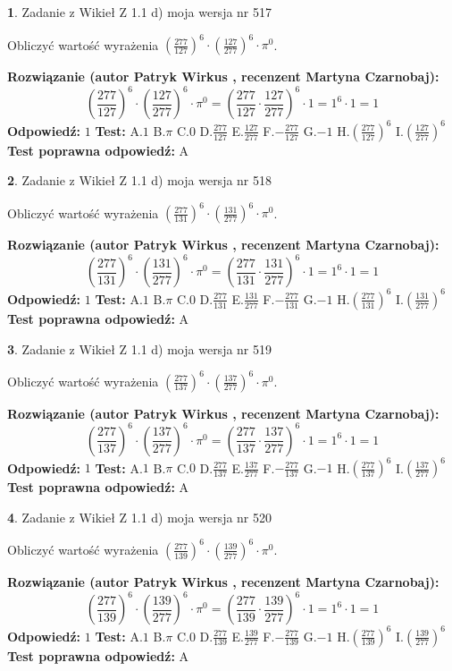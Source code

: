 \documentclass[12pt, a4paper]{article}
\theoremstyle{definition} %
\newtheorem{zad}{}
\newcommand{\zadStart}[1]{\begin{zad}#1\newline}
\newcommand{\zadStop}{\end{zad}}
\newcommand{\rozwStart}[2]{\noindent \textbf{Rozwiązanie (autor #1 , recenzent #2): }\newline}
\newcommand{\rozwStop}{\newline}
\newcommand{\odpStart}{\noindent \textbf{Odpowiedź:}\newline}
\newcommand{\odpStop}{\newline}
\newcommand{\testStart}{\noindent \textbf{Test:}\newline}
\newcommand{\testStop}{\newline}
\newcommand{\kluczStart}{\noindent \textbf{Test poprawna odpowiedź:}\newline}
\newcommand{\kluczStop}{\newline}
\begin{document}
\zadStart{Zadanie z Wikieł Z 1.1 d) moja wersja nr 517}

Obliczyć wartość wyrażenia $(\frac{277}{127})^{6} \cdot (\frac{127}{277})^{6} \cdot \pi^{0}$.
\zadStop
\rozwStart{Patryk Wirkus}{Martyna Czarnobaj}
$$(\frac{277}{127})^{6} \cdot (\frac{127}{277})^{6} \cdot \pi^{0} = (\frac{277}{127} \cdot \frac{127}{277})^{6} \cdot 1 = 1^{6} \cdot 1 = 1$$
\rozwStop
\odpStart
$1$
\odpStop
\testStart
A.$1$ B.$\pi$ C.$0$ D.$\frac{277}{127}$ E.$\frac{127}{277}$
F.$-\frac{277}{127}$ G.$-1$
H.$(\frac{277}{127})^{6}$
I.$(\frac{127}{277})^{6}$
\testStop
\kluczStart
A
\kluczStop



\zadStart{Zadanie z Wikieł Z 1.1 d) moja wersja nr 518}

Obliczyć wartość wyrażenia $(\frac{277}{131})^{6} \cdot (\frac{131}{277})^{6} \cdot \pi^{0}$.
\zadStop
\rozwStart{Patryk Wirkus}{Martyna Czarnobaj}
$$(\frac{277}{131})^{6} \cdot (\frac{131}{277})^{6} \cdot \pi^{0} = (\frac{277}{131} \cdot \frac{131}{277})^{6} \cdot 1 = 1^{6} \cdot 1 = 1$$
\rozwStop
\odpStart
$1$
\odpStop
\testStart
A.$1$ B.$\pi$ C.$0$ D.$\frac{277}{131}$ E.$\frac{131}{277}$
F.$-\frac{277}{131}$ G.$-1$
H.$(\frac{277}{131})^{6}$
I.$(\frac{131}{277})^{6}$
\testStop
\kluczStart
A
\kluczStop



\zadStart{Zadanie z Wikieł Z 1.1 d) moja wersja nr 519}

Obliczyć wartość wyrażenia $(\frac{277}{137})^{6} \cdot (\frac{137}{277})^{6} \cdot \pi^{0}$.
\zadStop
\rozwStart{Patryk Wirkus}{Martyna Czarnobaj}
$$(\frac{277}{137})^{6} \cdot (\frac{137}{277})^{6} \cdot \pi^{0} = (\frac{277}{137} \cdot \frac{137}{277})^{6} \cdot 1 = 1^{6} \cdot 1 = 1$$
\rozwStop
\odpStart
$1$
\odpStop
\testStart
A.$1$ B.$\pi$ C.$0$ D.$\frac{277}{137}$ E.$\frac{137}{277}$
F.$-\frac{277}{137}$ G.$-1$
H.$(\frac{277}{137})^{6}$
I.$(\frac{137}{277})^{6}$
\testStop
\kluczStart
A
\kluczStop



\zadStart{Zadanie z Wikieł Z 1.1 d) moja wersja nr 520}

Obliczyć wartość wyrażenia $(\frac{277}{139})^{6} \cdot (\frac{139}{277})^{6} \cdot \pi^{0}$.
\zadStop
\rozwStart{Patryk Wirkus}{Martyna Czarnobaj}
$$(\frac{277}{139})^{6} \cdot (\frac{139}{277})^{6} \cdot \pi^{0} = (\frac{277}{139} \cdot \frac{139}{277})^{6} \cdot 1 = 1^{6} \cdot 1 = 1$$
\rozwStop
\odpStart
$1$
\odpStop
\testStart
A.$1$ B.$\pi$ C.$0$ D.$\frac{277}{139}$ E.$\frac{139}{277}$
F.$-\frac{277}{139}$ G.$-1$
H.$(\frac{277}{139})^{6}$
I.$(\frac{139}{277})^{6}$
\testStop
\kluczStart
A
\kluczStop
\end{document}
